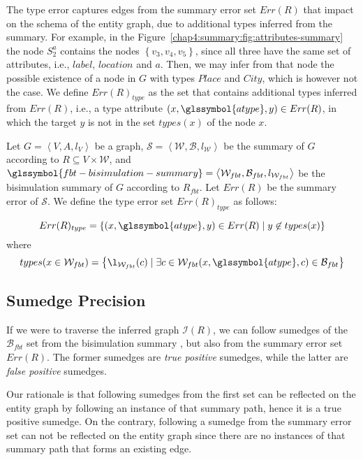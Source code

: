 The type error captures edges from the summary error set $Err(R)$ that impact on the schema of the entity graph, due to additional types inferred from the summary.
For example, in the Figure~\ref{chap4:summary:fig:attributes-summary} the node $S^a_2$ contains the nodes $\left\lbrace v_3, v_4, v_5 \right\rbrace$, since all three have the same set of \gls{attributes}, i.e., $label$, $location$ and $a$. Then, we may infer from that node the possible existence of a node in $G$ with types $Place$ and $City$, which is however not the case. We define $Err(R)_{type}$ as the set that contains additional types inferred from $Err(R)$, i.e., a type attribute $(x, \glssymbol{atype}, y) \in Err(R)$, in which the target $y$ is not in the set $types(x)$ of the node $x$.

\begin{definition}
	Let $G=\left\langle V, A, l_V \right\rangle$ be a graph, $\mathcal{S} = \left\langle \mathcal{W}, \mathcal{B}, l_{\mathcal{W}} \right\rangle$ be the summary of $G$ according to $R \subseteq V \times \mathcal{W}$, and $\glssymbol{fbt-bisimulation-summary} = \left\langle \mathcal{W}_{fbt}, \mathcal{B}_{fbt}, l_{\mathcal{W}_{fbt}} \right\rangle$ be the bisimulation summary of $G$ according to $R_{fbt}$. Let $Err(R)$ be the summary error of $\mathcal{S}$. We define the type error set $Err(R)_{type}$ as follows:

	$$
	Err(R)_{type} = \left\lbrace (x, \glssymbol{atype}, y) \in Err(R) \mid y \not \in types(x) \right\rbrace
	$$
	where
	$$
	types(x \in \mathcal{W}_{fbt}) = \left\lbrace \l_{\mathcal{W}_{fbt}}(c) \mid \exists c \in \mathcal{W}_{fbt} (x, \glssymbol{atype}, c) \in \mathcal{B}_{fbt} \right\rbrace
	$$
\end{definition}

\subsection{Sumedge Precision}
\label{sec:edge-precision}

If we were to traverse the inferred graph $\mathcal{I}(R)$, we can follow sumedges of the $\mathcal{B}_{fbt}$ set from the bisimulation summary , but also from the summary error set $Err(R)$. The former sumedges are \emph{true positive} sumedges, while the latter are \emph{false positive} sumedges.

Our rationale is that following sumedges from the first set can be reflected on the entity graph by following an instance of that summary path, hence it is a true positive sumedge. On the contrary, following a sumedge from the summary error set can not be reflected on the entity graph since there are no instances of that summary path that forms an existing edge.\\

